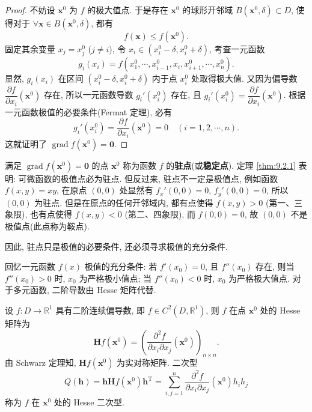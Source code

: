 \begin{proof}
不妨设 $\boldsymbol{x}^{0}$ 为 $f$ 的极大值点. 于是存在 $\boldsymbol{x}^{0}$ 的球形开邻域 $B(\boldsymbol{x}^{0}, \delta) \subset D$, 使得对于 $\forall \boldsymbol{x} \in B(\boldsymbol{x}^{0}, \delta)$, 都有
\[
  f(\boldsymbol{x}) \leqslant f(\boldsymbol{x}^{0}).
\]
固定其余变量 $x_{j} = x_{j}^{0}$ ($j \neq i$), 令 $x_{i} \in (x_{i}^{0} - \delta, x_{i}^{0} + \delta)$, 考查一元函数
\[
  g_{i}(x_{i}) = f(x_{1}^{0}, \cdots, x_{i-1}^{0}, x_{i}, x_{i+1}^{0}, \cdots, x_{n}^{0}).
\]
显然, $g_{i}(x_{i})$ 在区间 $(x_{i}^{0} - \delta, x_{i}^{0} + \delta)$ 内于点 $x_{i}^{0}$ 处取得极大值. 又因为偏导数 $\dfrac{\partial f}{\partial x_{i}}(\boldsymbol{x}^{0})$ 存在, 所以一元函数导数 $g_{i}'(x_{i}^{0})$ 存在, 且 $g_{i}'(x_{i}^{0}) = \dfrac{\partial f}{\partial x_{i}}(\boldsymbol{x}^{0})$. 根据一元函数极值的必要条件(Fermat 定理), 必有
\[
  g_{i}'(x_{i}^{0}) = \frac{\partial f}{\partial x_{i}}(\boldsymbol{x}^{0}) = 0 \quad (i = 1, 2, \cdots, n).
\]
这就证明了 $\operatorname{grad}f(\boldsymbol{x}^{0}) = \boldsymbol{0}$.
\end{proof}

满足 $\operatorname{grad}f(\boldsymbol{x}^{0}) = \boldsymbol{0}$ 的点 $\boldsymbol{x}^{0}$ 称为函数 $f$ 的\textbf{驻点}(或\textbf{稳定点}). 定理 \ref{thm:9.2.1} 表明: 可微函数的极值点必为驻点. 但反过来, 驻点不一定是极值点, 例如函数 $f(x, y) = xy$, 在原点 $(0, 0)$ 处显然有 $f_{x}'(0, 0) = 0$, $f_{y}'(0, 0) = 0$, 所以 $(0, 0)$ 为驻点. 但是在原点的任何开邻域内, 都有点使得 $f(x, y) > 0$ (第一、三象限), 也有点使得 $f(x, y) < 0$ (第二、四象限), 而 $f(0, 0) = 0$, 故 $(0, 0)$ 不是极值点(此点称为鞍点).

因此, 驻点只是极值的必要条件, 还必须寻求极值的充分条件.

回忆一元函数 $f(x)$ 极值的充分条件: 若 $f'(x_{0}) = 0$, 且 $f''(x_{0})$ 存在, 则当 $f''(x_{0}) > 0$ 时, $x_{0}$ 为严格极小值点; 当 $f''(x_{0}) < 0$ 时, $x_{0}$ 为严格极大值点. 对于多元函数, 二阶导数由 Hesse 矩阵代替.

设 $f\colon D \to \mathbb{R}^{1}$ 具有二阶连续偏导数, 即 $f \in C^{2}(D, \mathbb{R}^{1})$, 则 $f$ 在点 $\boldsymbol{x}^{0}$ 处的 Hesse 矩阵为
\[
  \boldsymbol{H}f(\boldsymbol{x}^{0}) = \left(\frac{\partial^{2}f}{\partial x_{i}\partial x_{j}}(\boldsymbol{x}^{0})\right)_{n \times n}.
\]
由 Schwarz 定理知, $\boldsymbol{H}f(\boldsymbol{x}^{0})$ 为实对称矩阵. 二次型
\[
  Q(\boldsymbol{h}) = \boldsymbol{h} \boldsymbol{H}f(\boldsymbol{x}^{0}) \boldsymbol{h}^{\mathrm{T}} = \sum_{i,j=1}^{n} \frac{\partial^{2}f}{\partial x_{i}\partial x_{j}}(\boldsymbol{x}^{0}) h_{i} h_{j}
\]
称为 $f$ 在 $\boldsymbol{x}^{0}$ 处的 Hesse 二次型.

